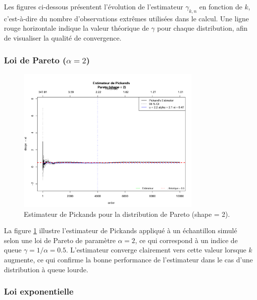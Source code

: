 \documentclass{article}
\begin{document}
Les figures ci-dessous présentent l’évolution de l’estimateur \(\hat{\gamma}_{k,n}\) en fonction de \(k\), c’est-à-dire du nombre d’observations extrêmes utilisées dans le calcul. Une ligne rouge horizontale indique la valeur théorique de \(\gamma\) pour chaque distribution, afin de visualiser la qualité de convergence.

\subsubsection{Loi de Pareto (\(\alpha = 2\))}

\begin{figure}[H]
    \centering
    \includegraphics[width=0.8\textwidth]{./images/pareto.png}
    \caption{Estimateur de Pickands pour la distribution de Pareto (shape = 2).}
    \label{fig:pickands_pareto}
\end{figure}

La figure \ref{fig:pickands_pareto} illustre l’estimateur de Pickands appliqué à un échantillon simulé selon une loi de Pareto de paramètre \(\alpha = 2\), ce qui correspond à un indice de queue \(\gamma = 1/\alpha = 0.5\). L’estimateur converge clairement vers cette valeur lorsque \(k\) augmente, ce qui confirme la bonne performance de l’estimateur dans le cas d’une distribution à queue lourde.

\subsubsection{Loi exponentielle}
\end{document}
